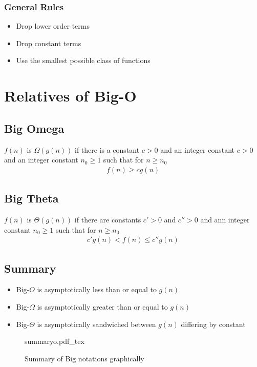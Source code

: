 \documentclass[a4paper]{article}
\newcommand{\incfig}[2][1]{%
    \def\svgwidth{#1\columnwidth}
    {#2.pdf_tex}
}
\theoremstyle{plain}
\theoremstyle{definition}
\newtheorem{defn}{Definition}[section]
\theoremstyle{remark}
\begin{document}
\subsubsection{General Rules}
\begin{itemize}
	\item Drop lower order terms
	\item Drop constant terms
	\item Use the smallest possible class of functions
\end{itemize}
\section{Relatives of Big-O}
\subsection{Big Omega}
\begin{tcolorbox}[colback=black!3!white,colframe=black!60!white,title=\begin{defn}Big Omega \label{Big Omega}\end{defn}]
$f( n)$ is $\Omega(g(n))$ if there is a constant $c > 0$ and an integer constant $c>0$ and an integer constant $n_0\ge 1$ such that for $n\ge n_0$
\begin{align}
f(n) \ge cg(n)
\end{align}
\end{tcolorbox}
\subsection{Big Theta}
\begin{tcolorbox}[colback=black!3!white,colframe=black!60!white,title=\begin{defn}Big Theta \label{Big Theta}\end{defn}]
$f(n)$ is $\Theta(g(n))$ if there are constants $c'>0$ and $c'' > 0$ and ann integer constant $n_0 \ge 1$ such that for $n \ge  n_0$
\begin{align}
c'g(n) <f(n) \le c''g(n)
\end{align}

\end{tcolorbox}
\subsection{Summary}
\begin{itemize}
	\item Big-$O$ is asymptotically less than or equal to $g(n)$ 
	\item Big-$\Omega$ is asymptotically greater than or equal to $g(n)$ 
	\item Big-$\Theta$ is asymptotically sandwiched between $g(n)$ differing by constant
\end{itemize}
\begin{figure}[H]
    \centering
    \incfig{summaryo}
    \caption{Summary of Big notations graphically}
    \label{fig:summaryo}
\end{figure}
\end{document}
